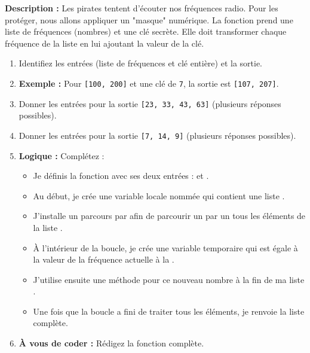 \newpage
\begin{Exercise}[title={La fonction \texttt{sceller\_donnees} (Complexe) }]
\textbf{Description :} Les pirates tentent d'écouter nos fréquences radio. Pour les protéger, nous allons appliquer un "masque" numérique. La fonction prend une liste de fréquences (nombres) et une clé secrète. Elle doit transformer chaque fréquence de la liste en lui ajoutant la valeur de la clé.
\begin{enumerate}
    \item Identifiez les entrées (liste de fréquences et clé entière) et la sortie.
    \item \textbf{Exemple :} Pour \texttt{[100, 200]} et une clé de \texttt{7}, la sortie est \texttt{[107, 207]}.
    \item Donner les entrées pour la sortie \texttt{[23, 33, 43, 63]} (plusieurs réponses possibles).
    \item Donner les entrées pour la sortie \texttt{[7, 14, 9]} (plusieurs réponses possibles).
    \item \textbf{Logique :} Complétez :
    \begin{itemize}
        \item Je définis la fonction \dotfill avec ses deux entrées : \dotfill et \dotfill.
        \item Au début, je crée une variable locale nommée \dotfill qui contient une liste \dotfill.
        \item J'installe un parcours par \dotfill afin de parcourir un par un tous les éléments de la liste \dotfill.
        \item À l'intérieur de la boucle, je crée une variable temporaire qui est égale à la valeur de la fréquence actuelle \dotfill à la \dotfill.
        \item J'utilise ensuite une méthode pour \dotfill ce nouveau nombre à la fin de ma liste \dotfill.
        \item Une fois que la boucle a fini de traiter tous les éléments, je renvoie la liste \dotfill complète.
    \end{itemize}
    \item \textbf{À vous de coder :} Rédigez la fonction complète.
\end{enumerate}
\end{Exercise}

